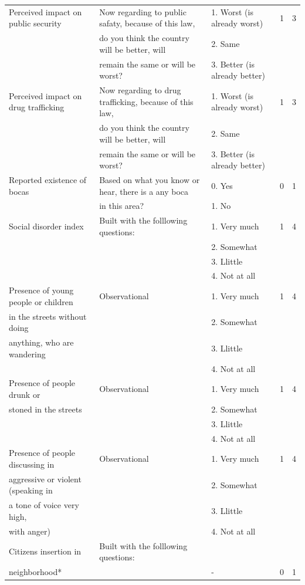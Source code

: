 \documentclass[11pt]{article}
\begin{document}
\begin{landscape}
\begin{tiny}
\begin{tabular}{lllcc}
Perceived impact on public security	&	Now regarding to public safaty, because of this law,	&	1.  Worst (is already worst)	&	1	&	3	\\
	&	 do you think the country will be better, will 	&	2. Same	&		&		\\
	&	remain the same or will be worst?	&	3. Better (is already better)	&		&		\\\hline
Perceived impact on drug trafficking	&	Now regarding to drug trafficking, because of this law,	&	1.  Worst (is already worst)	&	1	&	3	\\
	&	 do you think the country will be better, will 	&	2. Same	&		&		\\
	&	remain the same or will be worst?	&	3. Better (is already better)	&		&		\\\hline
Reported existence of bocas	&	Based on what you know or hear, there is a any boca	&	0. Yes	&	0	&	1	\\
	&	in this area?	&	1. No 	&		&		\\\hline
Social disorder index	&	Built with the folllowing questions:	&	1. Very much	&	1	&	4	\\
	&		&	2. Somewhat	&		&		\\
	&		&	3. Llittle	&		&		\\
	&		&	4. Not at all	&		&		\\
Presence of young people or children 	&	Observational	&	1. Very much	&	1	&	4	\\
in the streets without doing	&		&	2. Somewhat	&		&		\\
 anything, who are wandering	&		&	3. Llittle	&		&		\\
	&		&	4. Not at all	&		&		\\
Presence of   people drunk or 	&	Observational	&	1. Very much	&	1	&	4	\\
stoned in the streets	&		&	2. Somewhat	&		&		\\
	&		&	3. Llittle	&		&		\\
	&		&	4. Not at all	&		&		\\
Presence of people discussing in 	&	Observational	&	1. Very much	&	1	&	4	\\
aggressive or violent (speaking in 	&		&	2. Somewhat	&		&		\\
a tone of voice very high, 	&		&	3. Llittle	&		&		\\
with anger)	&		&	4. Not at all	&		&		\\\hline
Citizens insertion in 	&	Built with the folllowing questions:	&		&		&		\\
neighborhood*	&		&	-	&	0	&	1	\\

\end{tabular}
\end{tiny}
\end{landscape}
\end{document}
